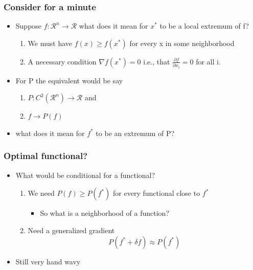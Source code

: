 \documentclass[10pt]{beamer}
\begin{document}
\begin{frame}
  \frametitle{Consider for a minute}
  \begin{itemize}
  \item Suppose $ f: \mathcal{R}^n \rightarrow \mathcal{R}$ what does it mean for $x^*$ to be a local extremum of f? 
    \begin{enumerate}
    \item We must have $f(x) \geq f(x^*)$ for every x in some neighborhood
    \item A necessary condition $\nabla f(x^*) = 0$ i.e., that $\frac{\partial f}{\partial x_i} = 0$ for all i. 
    \end{enumerate}
  \item For P the equivalent would be say
    \begin{enumerate}
    \item $P: C^2(\mathcal{R}^n) \rightarrow \mathcal{R}$ and
    \item $f \rightarrow P(f)$
    \end{enumerate}
  \item what does it mean for $f^*$ to be an extremum of P?
  \end{itemize}
\end{frame}

\begin{frame}
  \frametitle{Optimal functional? }
  \begin{itemize}
  \item What would be conditional for a functional?
    \begin{enumerate}
    \item We need $P(f) \geq P(f^*)$ for every functional close to $f^*$
      \begin{itemize}
      \item So what is a neighborhood of a function?
      \end{itemize}
    \item Need a generalized gradient
      \[
        P( f^* + \delta f ) \approx P(f^*)
      \]
    \end{enumerate}
  \item Still very hand wavy
  \end{itemize}
\end{frame}
\end{document}
